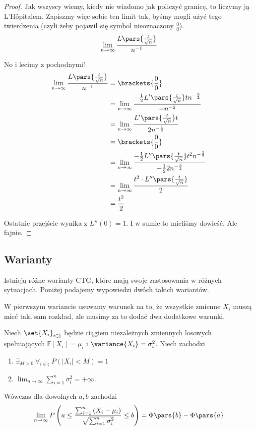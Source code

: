 \begin{proof}
	Jak wszyscy wiemy, kiedy nie wiadomo jak policzyć granicę, to liczymy ją L’Hôpitalem. Zapiszmy więc sobie ten limit tak, byśmy mogli użyć tego twierdzenia (czyli żeby pojawił się symbol nieoznaczony \( \frac{0}{0} \)).
	\[
		\lim_{n \to \infty}\frac{L\pars{\frac{t}{\sqrt{n}}}}{n^{-1}}
	\]

	No i lecimy z pochodnymi!
	\begin{align*}
		\lim_{n \to \infty}\frac{L \pars{\frac{t}{\sqrt{n}}}}{n^{-1}} &= \brackets{\frac{0}{0}}\\
		&= \lim_{n \to \infty}\frac{-\frac{1}{2}L'\pars{\frac{t}{\sqrt{n}}}tn^{-\frac{3}{2}}}{-n^{-2}}               \\
		& = \lim_{n \to \infty}\frac{L'\pars{\frac{t}{\sqrt{n}}}t}{2n^{-\frac{1}{2}}}                       \\
		&= \brackets{\frac{0}{0}}\\
		& = \lim_{n \to \infty}\frac{-\frac{1}{2}L''\pars{\frac{t}{\sqrt{n}}}t^2 n^{-\frac{3}{2}}}{-\frac{1}{2}2n^{-\frac{3}{2}}} \\
		& = \lim_{n \to \infty} \frac{t^2 \cdot L''\pars{\frac{t}{\sqrt{n}}}}{2}                            \\
		& = \frac{t^2}{2}
	\end{align*}

	Ostatnie przejście wynika z \(L''(0) = 1\). I w sumie to mieliśmy dowieść. Ale fajnie.
\end{proof}

\subsection{Warianty}
Istnieją różne warianty CTG, które mają swoje zastosowania w różnych sytuacjach. Poniżej podajemy wypowiedzi dwóch takich wariantów.

W pierwszym wariancie usuwamy warunek na to, że wszystkie zmienne \(X_i\) muszą mieć taki sam rozkład, ale musimy za to dodać dwa dodatkowe warunki.
\begin{theorem}
	Niech \(\set{X_i}_{i \in \natural}\) będzie ciągiem niezależnych zmiennych losowych spełniających \(\mathbb{E}\left[ X_i \right] = \mu_i\) i \(\variance{X_i} = \sigma_i^2\). Niech zachodzi
	\begin{enumerate}
		\item \(\exists_{M>0} \ \forall_{i \in \natural} \ P\left( \left|X_i\right|<M \right) = 1 \)
		\item \( \lim_{n \to \infty} \sum_{i=1}^{n} \sigma_i^2 = +\infty\).
	\end{enumerate}
	Wówczas dla dowolnych \(a, b\) zachodzi
	\[ 
		\lim_{n \to \infty} P\left( a \le \frac{ \sum_{i=1}^{n} \left( X_i - \mu_i \right) }{\sqrt{ \sum_{i=1}^{n} \sigma_i^2} } \le  b  \right) = \Phi\pars{b} - \Phi\pars{a}
	\]
\end{theorem}

